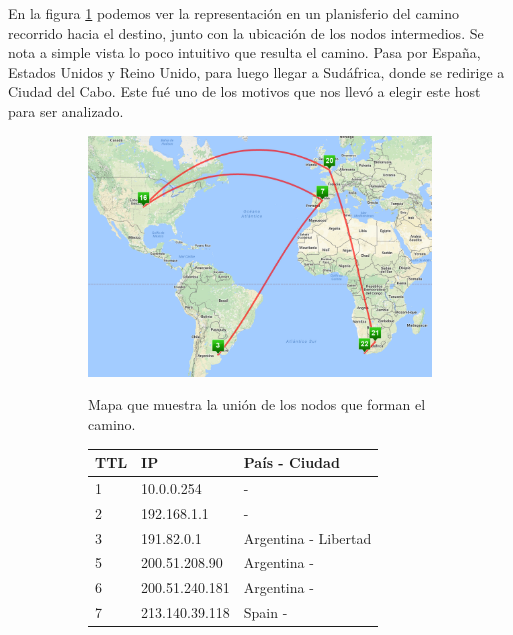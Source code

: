\par En la figura \ref{fig:capetown_map} podemos ver la representación en un planisferio del camino recorrido hacia el destino, junto con la ubicación de los nodos intermedios. Se nota a simple vista lo poco intuitivo que resulta el camino. Pasa por España, Estados Unidos y Reino Unido, para luego llegar a Sudáfrica, donde se redirige a Ciudad del Cabo. Este fué uno de los motivos que nos llevó a elegir este host para ser analizado.

\begin{figure}[ht]
  \hspace*{-0.4cm}
  \begin{subfigure}[b]{.60\textwidth}
    \includegraphics[width=\textwidth]{Imagenes/capetown_map.png}
    \label{fig:capetown_map}
    \caption{Mapa que muestra la unión de los nodos que forman el camino.}
  \end{subfigure}
  \begin{subfigure}[b]{.39\textwidth}
    \footnotesize
    \begin{tabular}{ l l l }
      \hline
      \textbf{TTL} & \textbf{IP} &  \textbf{País - Ciudad} \\ \hline
      1 & 10.0.0.254 &  - \\ \hline
      2 & 192.168.1.1 &  - \\ \hline
      3 & 191.82.0.1 & Argentina - Libertad\\ \hline
      5 & 200.51.208.90 & Argentina - \\ \hline
      6 & 200.51.240.181 & Argentina - \\ \hline
      7 & 213.140.39.118 & Spain - \\ \hline

\end{tabular}
\end{subfigure}
\end{figure}
